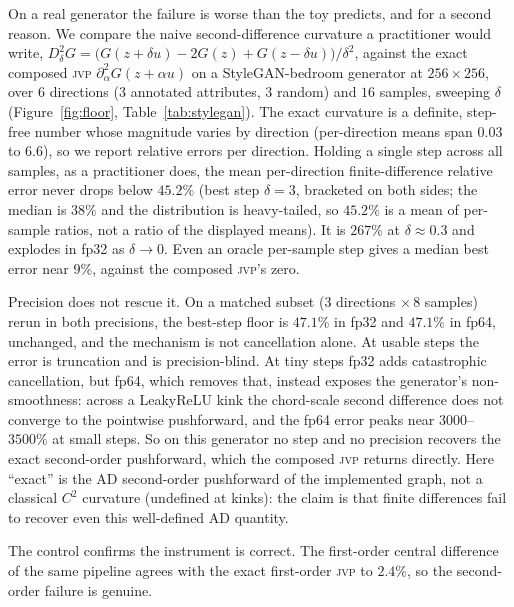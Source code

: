 \documentclass[10pt]{article} %
\newcommand{\jvp}{\textsc{jvp}}
\begin{document}
On a real generator the failure is worse than the toy predicts, and for a second
reason. We compare the naive second-difference curvature a practitioner would
write, $D^2_\delta G=\big(G(z{+}\delta u)-2G(z)+G(z{-}\delta u)\big)/\delta^2$,
against the exact composed \jvp{} $\partial^2_\alpha G(z{+}\alpha u)$ on a
StyleGAN-bedroom generator at $256{\times}256$, over $6$ directions ($3$
annotated attributes, $3$ random) and $16$ samples, sweeping $\delta$
(Figure~\ref{fig:floor}, Table~\ref{tab:stylegan}). The exact curvature is a
definite, step-free number whose magnitude varies by direction (per-direction means
span $0.03$ to $6.6$), so we report relative errors per direction. Holding a single
step across all samples, as a practitioner does, the mean per-direction
finite-difference relative error never drops below $45.2\%$ (best step $\delta=3$,
bracketed on both sides; the median is $38\%$ and the distribution is heavy-tailed,
so $45.2\%$ is a mean of per-sample ratios, not a ratio of the displayed means). It
is $267\%$ at $\delta\!\approx\!0.3$ and explodes in fp32 as $\delta\to0$. Even an
oracle per-sample step gives a median best error near $9\%$, against the composed
\jvp's zero.

Precision does not rescue it. On a matched subset ($3$ directions $\times\,8$
samples) rerun in both precisions, the best-step floor is $47.1\%$ in fp32 and
$47.1\%$ in fp64, unchanged, and the mechanism is not cancellation alone. At usable
steps the error is truncation and is precision-blind. At tiny steps fp32 adds
catastrophic cancellation, but fp64, which removes that, instead exposes the
generator's non-smoothness: across a LeakyReLU kink the chord-scale second
difference does not converge to the pointwise pushforward, and the fp64 error peaks
near $3000$--$3500\%$ at small steps. So on this generator no step and no precision
recovers the exact second-order pushforward, which the composed \jvp{} returns
directly. Here ``exact'' is the AD second-order pushforward of the implemented graph,
not a classical $C^2$ curvature (undefined at kinks): the claim is that finite
differences fail to recover even this well-defined AD quantity.

The control confirms the instrument is correct. The first-order central difference
of the same pipeline agrees with the exact first-order \jvp{} to $2.4\%$, so the
second-order failure is genuine.
\end{document}

